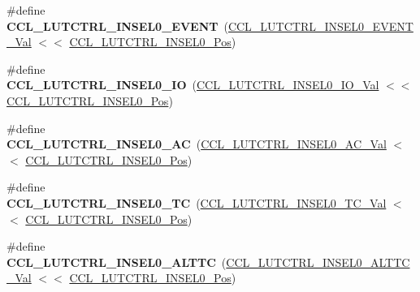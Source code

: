 \begin{DoxyCompactItemize}
\item 
\hypertarget{group___s_a_m_l21___c_c_l_ga1867b5a45b69b627ba8ba4c70ab208d9}{}\#define {\bfseries C\+C\+L\+\_\+\+L\+U\+T\+C\+T\+R\+L\+\_\+\+I\+N\+S\+E\+L0\+\_\+\+E\+V\+E\+N\+T}~(\hyperlink{group___s_a_m_l21___c_c_l_ga16ec41d6b721dada46dd341a50c2559c}{C\+C\+L\+\_\+\+L\+U\+T\+C\+T\+R\+L\+\_\+\+I\+N\+S\+E\+L0\+\_\+\+E\+V\+E\+N\+T\+\_\+\+Val}  $<$$<$ \hyperlink{group___s_a_m_l21___c_c_l_gae20b08aa5e8fcd9eb3a1a118441de53d}{C\+C\+L\+\_\+\+L\+U\+T\+C\+T\+R\+L\+\_\+\+I\+N\+S\+E\+L0\+\_\+\+Pos})\label{group___s_a_m_l21___c_c_l_ga1867b5a45b69b627ba8ba4c70ab208d9}

\item 
\hypertarget{group___s_a_m_l21___c_c_l_ga0e79709ea8c64a73634a9b8b52b01f15}{}\#define {\bfseries C\+C\+L\+\_\+\+L\+U\+T\+C\+T\+R\+L\+\_\+\+I\+N\+S\+E\+L0\+\_\+\+I\+O}~(\hyperlink{group___s_a_m_l21___c_c_l_gaec398330a7a9b4476e0223c902ddd0fa}{C\+C\+L\+\_\+\+L\+U\+T\+C\+T\+R\+L\+\_\+\+I\+N\+S\+E\+L0\+\_\+\+I\+O\+\_\+\+Val}     $<$$<$ \hyperlink{group___s_a_m_l21___c_c_l_gae20b08aa5e8fcd9eb3a1a118441de53d}{C\+C\+L\+\_\+\+L\+U\+T\+C\+T\+R\+L\+\_\+\+I\+N\+S\+E\+L0\+\_\+\+Pos})\label{group___s_a_m_l21___c_c_l_ga0e79709ea8c64a73634a9b8b52b01f15}

\item 
\hypertarget{group___s_a_m_l21___c_c_l_gac6a2d6140647a33918f4c80cdc5baa62}{}\#define {\bfseries C\+C\+L\+\_\+\+L\+U\+T\+C\+T\+R\+L\+\_\+\+I\+N\+S\+E\+L0\+\_\+\+A\+C}~(\hyperlink{group___s_a_m_l21___c_c_l_ga6b0b5f0f5cc7959cdb36fada583b7c83}{C\+C\+L\+\_\+\+L\+U\+T\+C\+T\+R\+L\+\_\+\+I\+N\+S\+E\+L0\+\_\+\+A\+C\+\_\+\+Val}     $<$$<$ \hyperlink{group___s_a_m_l21___c_c_l_gae20b08aa5e8fcd9eb3a1a118441de53d}{C\+C\+L\+\_\+\+L\+U\+T\+C\+T\+R\+L\+\_\+\+I\+N\+S\+E\+L0\+\_\+\+Pos})\label{group___s_a_m_l21___c_c_l_gac6a2d6140647a33918f4c80cdc5baa62}

\item 
\hypertarget{group___s_a_m_l21___c_c_l_gab10da37586cb29914abeeb0177e3f84f}{}\#define {\bfseries C\+C\+L\+\_\+\+L\+U\+T\+C\+T\+R\+L\+\_\+\+I\+N\+S\+E\+L0\+\_\+\+T\+C}~(\hyperlink{group___s_a_m_l21___c_c_l_ga8cb43425ea1200a431b3086d58e218da}{C\+C\+L\+\_\+\+L\+U\+T\+C\+T\+R\+L\+\_\+\+I\+N\+S\+E\+L0\+\_\+\+T\+C\+\_\+\+Val}     $<$$<$ \hyperlink{group___s_a_m_l21___c_c_l_gae20b08aa5e8fcd9eb3a1a118441de53d}{C\+C\+L\+\_\+\+L\+U\+T\+C\+T\+R\+L\+\_\+\+I\+N\+S\+E\+L0\+\_\+\+Pos})\label{group___s_a_m_l21___c_c_l_gab10da37586cb29914abeeb0177e3f84f}

\item 
\hypertarget{group___s_a_m_l21___c_c_l_ga71f684e92b0ce351a3ec8c8e473e2a61}{}\#define {\bfseries C\+C\+L\+\_\+\+L\+U\+T\+C\+T\+R\+L\+\_\+\+I\+N\+S\+E\+L0\+\_\+\+A\+L\+T\+T\+C}~(\hyperlink{group___s_a_m_l21___c_c_l_ga98b064aa8877e7ce77ecb683353fd5d8}{C\+C\+L\+\_\+\+L\+U\+T\+C\+T\+R\+L\+\_\+\+I\+N\+S\+E\+L0\+\_\+\+A\+L\+T\+T\+C\+\_\+\+Val}  $<$$<$ \hyperlink{group___s_a_m_l21___c_c_l_gae20b08aa5e8fcd9eb3a1a118441de53d}{C\+C\+L\+\_\+\+L\+U\+T\+C\+T\+R\+L\+\_\+\+I\+N\+S\+E\+L0\+\_\+\+Pos})\label{group___s_a_m_l21___c_c_l_ga71f684e92b0ce351a3ec8c8e473e2a61}


\end{DoxyCompactItemize}
